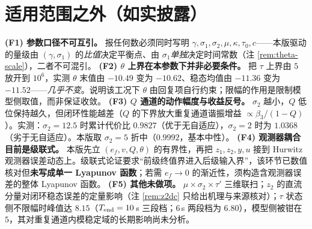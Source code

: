 \documentclass[11pt]{article}
\theoremstyle{remark}\newtheorem{remark}{注}
\newcommand{\ef}{e_f}
\begin{document}
\section{适用范围之外（如实披露）}\label{sec:limit}
\noindent\textbf{(F1) 参数口径不可互引。} 报任何数必须同时写明 $\gamma,\sigma_1,\sigma_2,\mu,\kappa,\tau_0,c$——本版驱动的量级由 $(\gamma,\sigma_1)$ 的\emph{比值}决定平衡点、由 $\sigma_1$\emph{单独}决定时间常数（注 \ref{rem:theta-scale}），二者不可混引。
\vspace{1mm}
\noindent\textbf{(F2) $\theta$ 上界在本参数下并非必要条件。} 把 $\tau$ 上界由 $5$ 放开到 $10^{6}$，实测 $\theta$ 末值由 $-10.49$ 变为 $-10.62$、稳态均值由 $-11.36$ 变为 $-11.52$——\emph{几乎不变}。说明该工况下 $\theta$ 由回复项自行约束；限幅的作用是限制模型侧取值，而非保证收敛。
\vspace{1mm}
\noindent\textbf{(F3) $Q$ 通道的动作幅度与收益反号。} $\sigma_2$ 越小，$Q$ 低位保持越久，但闭环性能越差（$Q$ 的下界放大重复通道谐振增益 $\propto\beta_3/(1-Q)$）。实测：$\sigma_2=12.5$ 时累计代价比 $0.9827$（优于无自适应），$\sigma_2=2$ 时为 $1.0368$（劣于无自适应）。本版取 $\sigma_2=5$ 折中（$0.9992$，基本中性）。
\vspace{1mm}
\noindent\textbf{(F4) 观测器耦合目前是级联式。} 本版先立 $(\ef,v,Q,\theta)$ 的有界性，再把 $z_1,z_2,y,u$ 接到 Hurwitz 观测器误差动态上。级联式论证要求“前级终值界进入后级输入界”，该环节已数值核对但\textbf{未写成单一 Lyapunov 函数}；若需 $\ef\to0$ 的渐近性，须构造含观测器误差的整体 Lyapunov 函数。
\vspace{1mm}
\noindent\textbf{(F5) 其他未做项。} $\mu\times\sigma_2\times\tau'$ 三维联扫；$z_2$ 的直流分量对闭环稳态误差的定量影响（注 \ref{rem:z2dc} 只给出机理与来源核对）；$\tau$ 状态侧不限幅时峰值达 $8.15$（$T_{\rm end}=10$\,s 三段档；$6$\,s 两段档为 $6.80$），模型侧被钳在 $5$，其对重复通道内模稳定域的长期影响尚未分析。
\end{document}
